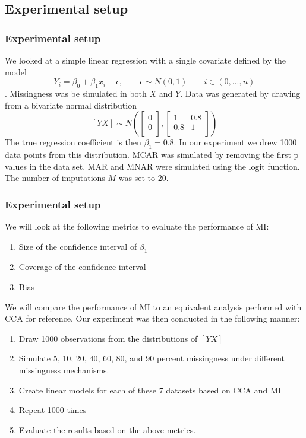 \documentclass{beamer}
\begin{document}
\subsection{Experimental setup}
\begin{frame}
\frametitle{Experimental setup}
We looked at a simple linear regression with a single covariate defined by the model $$Y_{i} = \beta_{0} + \beta_{1}x_{i} + \epsilon, \qquad \epsilon \sim N(0,1) \qquad i\in(0,...,n)$$. Missingness was be simulated in both $X$ and $Y$. Data was generated by drawing from a bivariate normal distribution $$[Y X] \sim N(\begin{bmatrix}
0 \\
0 \\
\end{bmatrix},\begin{bmatrix}
1 & 0.8 \\
0.8 & 1 \\
\end{bmatrix})$$ The true regression coefficient is then $\beta_{1} = 0.8$. In our experiment we drew 1000 data points from this distribution. MCAR was simulated by removing the first p values in the data set. MAR and MNAR were simulated using the logit function. The number of imputations $M$ was set to 20.
\end{frame}

\begin{frame}
\frametitle{Experimental setup}
We will look at the following metrics to evaluate the performance of MI:

\begin{enumerate}
	\item<1-> Size of the confidence interval of $\beta_{1}$
	\item<2-> Coverage of the confidence interval
	\item<3-> Bias
\end{enumerate}

We will compare the performance of MI to an equivalent analysis performed with CCA for reference. Our experiment was then conducted in the following manner:

\begin{enumerate}
	\item<4-> Draw 1000 observations from the distributions of $[Y X]$
	\item<5-> Simulate 5, 10, 20, 40, 60, 80, and 90 percent missingness under different missingness mechanisms.
	\item<6-> Create linear models for each of these 7 datasets based on CCA and MI
	\item<7-> Repeat 1000 times
	\item<8-> Evaluate the results based on the above metrics.
\end{enumerate}
\end{frame}
\end{document}
